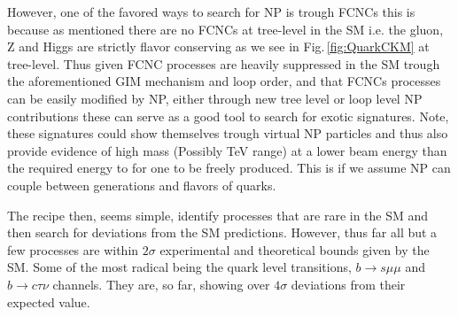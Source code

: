However, one of the favored ways to search for NP is trough FCNCs this is because as mentioned there are no FCNCs at tree-level in the SM i.e. the gluon, Z and Higgs are strictly flavor conserving as we see in Fig.\,\ref{fig:QuarkCKM} at tree-level.  
%
Thus given FCNC processes are heavily suppressed in the SM trough the aforementioned GIM mechanism and loop order, and that FCNCs processes can be easily modified by NP, either through new tree level or loop level NP contributions these can serve as a good tool to search for exotic signatures. 
%
Note, these signatures could show themselves trough virtual NP particles and thus also provide evidence of high mass (Possibly TeV range) at a lower beam energy than the required energy to for one to be freely produced. 
%
This is if we assume NP can couple between generations and flavors of quarks. 



The recipe then, seems simple, identify processes that are rare in the SM and then search for deviations from the SM predictions.
%
However, thus far all but a few processes are within $2\sigma$ experimental and theoretical bounds given by the SM. 
%
Some of the most radical being the quark level transitions, $b \rightarrow s \mu \mu$ \cite{DAmico2017}%
 and $b \rightarrow c \tau \nu$ \cite{Hu2019} channels. %
%
They are, so far, showing over $ 4 \sigma$ deviations from their expected value. 

